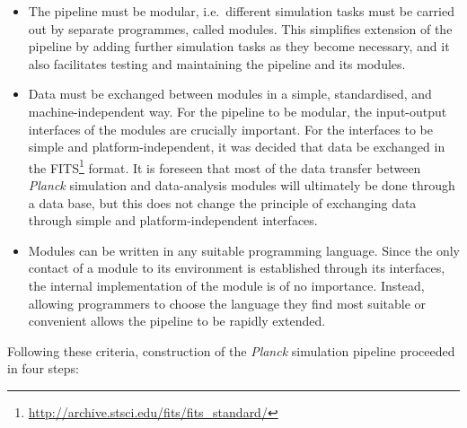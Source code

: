 \documentclass{aa}
\begin{document}
\begin{itemize}

\item The pipeline must be modular, i.e.~different simulation tasks
  must be carried out by separate programmes, called modules. This
  simplifies extension of the pipeline by adding further simulation tasks
  as they become necessary, and it also facilitates testing and
  maintaining the pipeline and its modules.

\item Data must be exchanged between modules in a simple,
  standardised, and machine-independent way. For the pipeline to be
  modular, the input-output interfaces of the modules are crucially
  important. For the interfaces to be simple and platform-independent,
  it was decided that data be exchanged in the FITS\footnote{\href{http://archive.stsci.edu/fits/fits_standard/}{http://archive.stsci.edu/fits/fits\_standard/}}
  format. It is foreseen that most of the data transfer
  between \emph{Planck} simulation and data-analysis modules will
  ultimately be done through a data base, but this does not change the
  principle of exchanging data through simple and platform-independent
  interfaces.

\item Modules can be written in any suitable programming
  language. Since the only contact of a module to its environment is
  established through its interfaces, the internal implementation of
  the module is of no importance. Instead, allowing programmers to
  choose the language they find most suitable or convenient allows
  the pipeline to be rapidly extended.

\end{itemize}

Following these criteria, construction of the \emph{Planck}
simulation pipeline proceeded in four steps:
\end{document}
